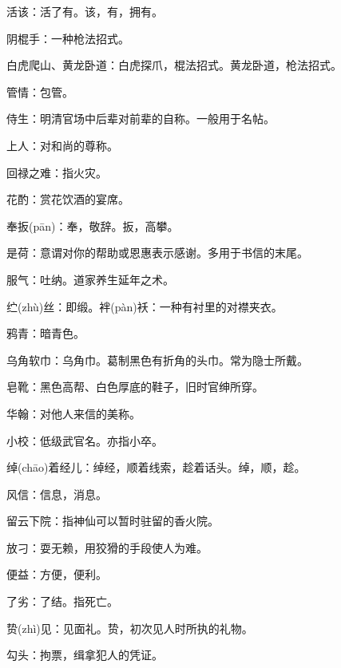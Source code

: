 \startbuffer[687]
活该：活了有。该，有，拥有。
\stopbuffer


\startbuffer[688]
阴棍手：一种枪法招式。
\stopbuffer


\startbuffer[689]
白虎爬山、黄龙卧道：白虎探爪，棍法招式。黄龙卧道，枪法招式。
\stopbuffer


\startbuffer[690]
管情：包管。
\stopbuffer


\startbuffer[691]
侍生：明清官场中后辈对前辈的自称。一般用于名帖。
\stopbuffer


\startbuffer[692]
上人：对和尚的尊称。
\stopbuffer


\startbuffer[693]
回禄之难：指火灾。
\stopbuffer


\startbuffer[694]
花酌：赏花饮酒的宴席。
\stopbuffer


\startbuffer[695]
奉扳(pān)：奉，敬辞。扳，高攀。
\stopbuffer


\startbuffer[696]
是荷：意谓对你的帮助或恩惠表示感谢。多用于书信的末尾。
\stopbuffer


\startbuffer[697]
服气：吐纳。道家养生延年之术。
\stopbuffer


\startbuffer[698]
纻(zhù)丝：即缎。袢(pàn)袄：一种有衬里的对襟夹衣。
\stopbuffer


\startbuffer[699]
鸦青：暗青色。
\stopbuffer


\startbuffer[700]
乌角软巾：乌角巾。葛制黑色有折角的头巾。常为隐士所戴。
\stopbuffer


\startbuffer[701]
皂靴：黑色高帮、白色厚底的鞋子，旧时官绅所穿。
\stopbuffer


\startbuffer[702]
华翰：对他人来信的美称。
\stopbuffer


\startbuffer[703]
小校：低级武官名。亦指小卒。
\stopbuffer


\startbuffer[704]
绰(chāo)着经儿：绰经，顺着线索，趁着话头。绰，顺，趁。
\stopbuffer


\startbuffer[705]
风信：信息，消息。
\stopbuffer


\startbuffer[706]
留云下院：指神仙可以暂时驻留的香火院。
\stopbuffer


\startbuffer[707]
放刁：耍无赖，用狡猾的手段使人为难。
\stopbuffer


\startbuffer[708]
便益：方便，便利。
\stopbuffer


\startbuffer[709]
了劣：了结。指死亡。
\stopbuffer


\startbuffer[710]
贽(zhì)见：见面礼。贽，初次见人时所执的礼物。
\stopbuffer


\startbuffer[711]
勾头：拘票，缉拿犯人的凭证。
\stopbuffer


